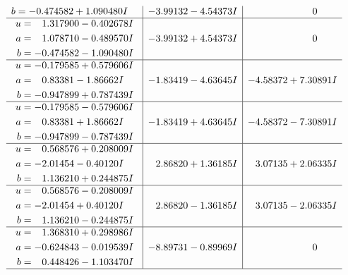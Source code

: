 \documentclass[1p]{elsarticle_modified}
\theoremstyle{definition}
\begin{document}
$$\begin{array}{c|c|c}
\begin{aligned}
b &= -0.474582 + 1.090480 I\end{aligned}
 & -3.99132 - 4.54373 I & \phantom{-0.000000 } 0 \\ \hline\begin{aligned}
u &= \phantom{-}1.317900 - 0.402678 I \\
a &= \phantom{-}1.078710 - 0.489570 I \\
b &= -0.474582 - 1.090480 I\end{aligned}
 & -3.99132 + 4.54373 I & \phantom{-0.000000 } 0 \\ \hline\begin{aligned}
u &= -0.179585 + 0.579606 I \\
a &= \phantom{-}0.83381 - 1.86662 I \\
b &= -0.947899 + 0.787439 I\end{aligned}
 & -1.83419 - 4.63645 I & -4.58372 + 7.30891 I \\ \hline\begin{aligned}
u &= -0.179585 - 0.579606 I \\
a &= \phantom{-}0.83381 + 1.86662 I \\
b &= -0.947899 - 0.787439 I\end{aligned}
 & -1.83419 + 4.63645 I & -4.58372 - 7.30891 I \\ \hline\begin{aligned}
u &= \phantom{-}0.568576 + 0.208009 I \\
a &= -2.01454 - 0.40120 I \\
b &= \phantom{-}1.136210 + 0.244875 I\end{aligned}
 & \phantom{-}2.86820 + 1.36185 I & \phantom{-}3.07135 + 2.06335 I \\ \hline\begin{aligned}
u &= \phantom{-}0.568576 - 0.208009 I \\
a &= -2.01454 + 0.40120 I \\
b &= \phantom{-}1.136210 - 0.244875 I\end{aligned}
 & \phantom{-}2.86820 - 1.36185 I & \phantom{-}3.07135 - 2.06335 I \\ \hline\begin{aligned}
u &= \phantom{-}1.368310 + 0.298986 I \\
a &= -0.624843 - 0.019539 I \\
b &= \phantom{-}0.448426 - 1.103470 I\end{aligned}
 & -8.89731 - 0.89969 I & \phantom{-0.000000 } 0\\
 \hline 
 \end{array}$$\newpage$$\begin{array}{c|c|c}  

\end{array}$$
\end{document}
